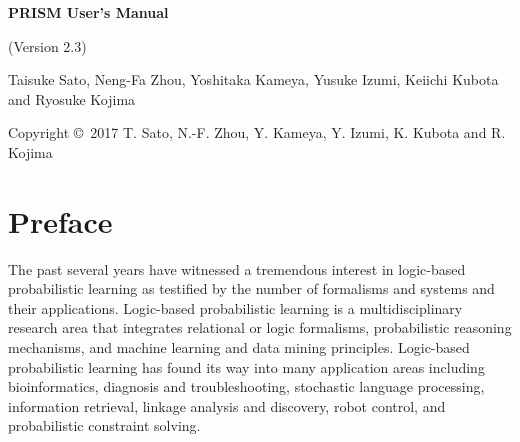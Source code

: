 \documentclass[a4paper]{report}
\begin{document}
\begin{center}
\par\vspace*{3cm}\par
{\Huge\bf PRISM User's Manual}\par\vspace*{0.5cm}\par
{\Large (Version 2.3)}\par\vspace*{12cm}\par

{\normalsize Taisuke Sato, Neng-Fa Zhou, Yoshitaka Kameya, Yusuke Izumi, Keiichi Kubota and Ryosuke Kojima}


\par\vspace*{2cm}\par

{\footnotesize Copyright \copyright~2017 T. Sato, N.-F. Zhou, Y. Kameya, Y. Izumi, K. Kubota and R. Kojima}
\end{center}
\thispagestyle{empty}
\setcounter{page}{0}%
\clearpage


\section*{Preface}

The past several years have witnessed a tremendous interest in logic-based
probabilistic learning as testified by the number of formalisms and systems
and their applications. Logic-based probabilistic learning is a multidisciplinary
research area that integrates relational or logic formalisms, probabilistic
reasoning mechanisms, and machine learning and data mining principles.
Logic-based probabilistic learning has found its way into many application
areas including bioinformatics, diagnosis and troubleshooting, stochastic
language processing, information retrieval, linkage analysis and discovery,
robot control, and probabilistic constraint solving.
\end{document}
